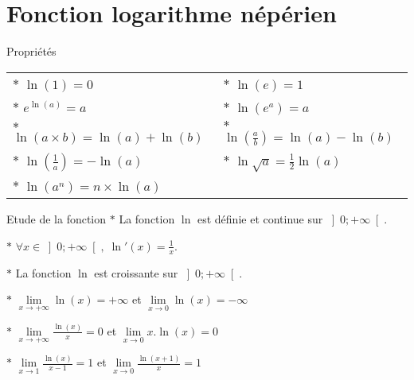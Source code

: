 \section{Fonction logarithme népérien}

\begin{bclogo}{Propriétés}
\begin{center}
\begin{tabular}{ll}

$\ast$ $\ln (1)=0$&$\ast$ $\ln (e)=1$\\

$\ast$ $e^{\ln (a)}=a$&$\ast$ $\ln (e^a)=a$\\

$\ast$ $\ln (a\times b)=\ln (a)+\ln (b)$&$\ast$ $\ln \left( \frac{a}{b}\right) =\ln (a)-\ln (b)$\\

$\ast$ $\ln \left( \frac{1}{a}\right) =-\ln (a)$&$\ast$ $\ln \sqrt{a}=\frac{1}{2}\ln (a)$\\

$\ast$ $\ln (a^n)=n\times \ln(a)$
\end{tabular}
\end{center}
\end{bclogo}
\medskip


\begin{bclogo}{Etude de la fonction}
$\ast$ La fonction $\ln$ est définie et continue sur $\left] 0;+\infty\right[$.

$\ast$ $\forall x\in \left] 0;+\infty\right[,\;\ln '(x)=\frac{1}{x}$.

$\ast$ La fonction $\ln$ est croissante sur $\left]0;+\infty\right[$.

$\ast$ $\lim\limits_{x\to +\infty} \ln (x)=+\infty$ et $\lim\limits_{x\to 0} \ln (x)=-\infty$

$\ast$ $\lim\limits_{x\to +\infty} \frac{\ln (x)}{x}=0$ et $\lim\limits_{x\to 0} x.\ln (x)=0$

$\ast$ $\lim\limits_{x\to 1} \frac{\ln (x)}{x-1}=1$ et $\lim\limits_{x\to 0} \frac{\ln (x+1)}{x}=1$

\end{bclogo}

\medskip

